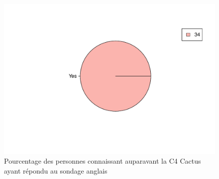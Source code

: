 \documentclass[12pt]{article}\usepackage[]{graphicx}\usepackage[]{color}
\makeatletter
\def\maxwidth{ %
  \ifdim\Gin@nat@width>\linewidth
    \linewidth
  \else
    \Gin@nat@width
  \fi
}
\newenvironment{knitrout}{}{} %
\makeatother
\begin{document}
\begin{knitrout}
\color{fgcolor}\begin{figure}[H]
\includegraphics[width=\maxwidth]{figure/know_en-1} \caption[Pourcentage des personnes connaissant auparavant la C4 Cactus ayant répondu au sondage anglais]{Pourcentage des personnes connaissant auparavant la C4 Cactus ayant répondu au sondage anglais}\label{fig:know en}
\end{figure}


\end{knitrout}
\end{document}
